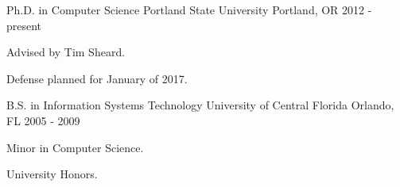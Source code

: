 

\begin{cventries}

  \cventry
    {Ph.D. in Computer Science} %
    {Portland State University} %
    {Portland, OR} %
    {2012 - present} %
    {
      \begin{cvitems} %
        \item {Advised by Tim Sheard.}
        \item {Defense planned for January of 2017.}
      \end{cvitems}
    }



  \cventry
    {B.S. in Information Systems Technology} %
    {University of Central Florida} %
    {Orlando, FL} %
    {2005 - 2009} %
    {
      \begin{cvitems} %
        \item {Minor in Computer Science.}
        \item {University Honors.}
      \end{cvitems}
    }

\end{cventries}
